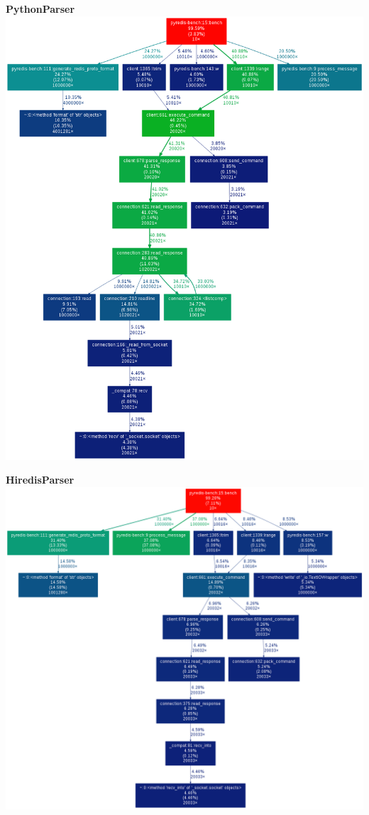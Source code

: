 \documentclass[a4paper, 11pt]{report}
\begin{document}
\begin{minipage}[t]{0.5\linewidth}
\textbf{PythonParser}\\

\includegraphics[width=0.9\linewidth]{pics/redis-cli-py.png}
\end{minipage}
\quad
\begin{minipage}[t]{0.5\linewidth}
\textbf{HiredisParser}\\

\includegraphics[width=0.9\linewidth]{pics/redis-cli-hi.png}
\end{minipage}
\end{document}
